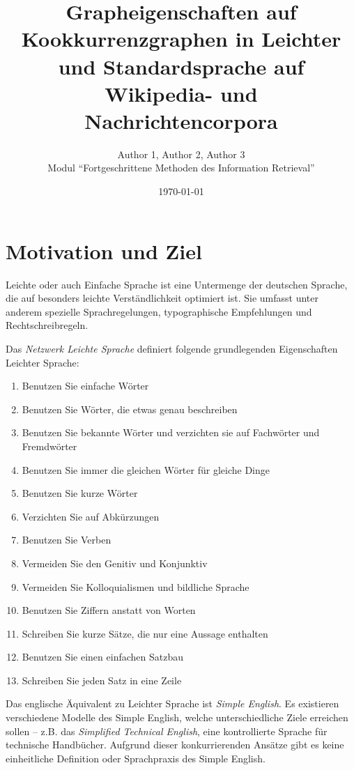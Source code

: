\documentclass[11pt, a4paper]{article}
\title{Grapheigenschaften auf Kookkurrenzgraphen in Leichter und Standardsprache auf Wikipedia- und Nachrichtencorpora}
\author{Author 1, Author 2, Author 3\\Modul "`Fortgeschrittene Methoden des Information Retrieval"'}
\date{\today}
\begin{document}
\maketitle
\tableofcontents

\section{Motivation und Ziel}

Leichte oder auch Einfache Sprache ist eine Untermenge der deutschen Sprache,
die auf besonders leichte Verst\"andlichkeit optimiert ist. Sie umfasst unter
anderem spezielle Sprachregelungen, typographische Empfehlungen und
Rechtschreibregeln. 

Das \emph{Netzwerk Leichte Sprache} definiert folgende grundlegenden
Eigenschaften Leichter Sprache\cite{nls_regeln}:

\begin{enumerate}
	\item Benutzen Sie einfache W\"orter
	\item Benutzen Sie W\"orter, die etwas genau beschreiben
	\item Benutzen Sie bekannte W\"orter und verzichten sie auf Fachw\"orter und Fremdw\"orter
	\item Benutzen Sie immer die gleichen W\"orter f\"ur gleiche Dinge
	\item Benutzen Sie kurze W\"orter
	\item Verzichten Sie auf Abk\"urzungen
	\item Benutzen Sie Verben
	\item Vermeiden Sie den Genitiv und Konjunktiv
	\item Vermeiden Sie Kolloquialismen und bildliche Sprache
	\item Benutzen Sie Ziffern anstatt von Worten
	\item Schreiben Sie kurze S\"atze, die nur eine Aussage enthalten
	\item Benutzen Sie einen einfachen Satzbau
	\item Schreiben Sie jeden Satz in eine Zeile
\end{enumerate}

Das englische \"Aquivalent zu Leichter Sprache ist \emph{Simple English}. Es
existieren verschiedene Modelle des Simple English, welche unterschiedliche
Ziele erreichen sollen -- z.B. das \emph{Simplified Technical English}, eine
kontrollierte Sprache f\"ur technische Handb\"ucher. Aufgrund dieser
konkurrierenden Ans\"atze gibt es keine einheitliche Definition oder
Sprachpraxis des Simple English. %
\end{document}
